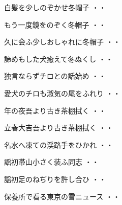 \begin{shiika}白髪を少しのぞかせ冬帽子
\hfill{・・}\end{shiika}
\vspace{0.6cm}
\begin{shiika}もう一度鏡をのぞく冬帽子
\hfill{・・}\end{shiika}
\vspace{0.6cm}
\begin{shiika}久に会ふ少しおしゃれに冬帽子
\hfill{・・}\end{shiika}
\vspace{0.6cm}
\begin{shiika}諦めもした犬癒えて冬ぬくし
\hfill{・・}\end{shiika}
\vspace{0.6cm}
\begin{shiika}独言ならずチロとの話始め
\hfill{・・}\end{shiika}
\vspace{0.6cm}
\begin{shiika}愛犬のチロも淑気の尾をふれり
\hfill{・・}\end{shiika}
\vspace{0.6cm}
\begin{shiika}年の夜吾より古き茶棚拭く
\hfill{・・}\end{shiika}
\vspace{0.6cm}
\begin{shiika}立春大吉吾より古き茶棚拭く
\hfill{・・}\end{shiika}
\vspace{0.6cm}
\begin{shiika}名水へ凍ての渓路手をひかれ
\hfill{・・}\end{shiika}
\vspace{0.6cm}
\begin{shiika}謡初帯山小さく装ふ同志
\hfill{・・}\end{shiika}
\vspace{0.6cm}
\begin{shiika}謡初足のねぢりを許し合ひ
\hfill{・・}\end{shiika}
\vspace{0.6cm}
\begin{shiika}保養所で看る東京の雪ニュース
\hfill{・・}\end{shiika}

